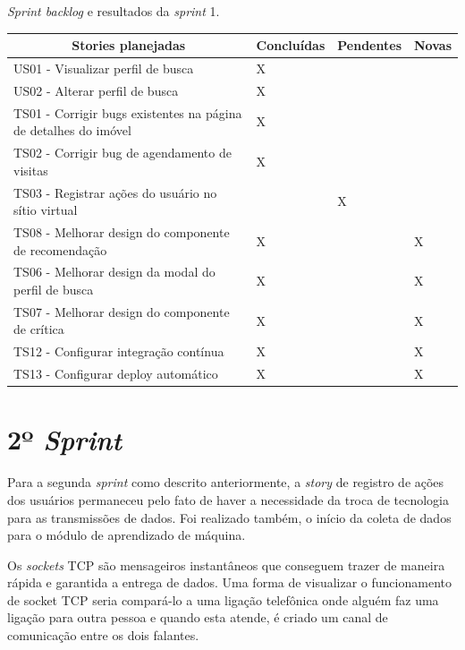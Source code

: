 \begin{quadro}[H]
\centering
\caption[\textit{Sprint backlog} e resultados da \textit{sprint} 1]{\textit{Sprint backlog} e resultados da \textit{sprint} 1.}
\label{quadro:sprint1}
\begin{tabular}{|p{6cm}|p{2cm}|p{2cm}|p{1cm}|}
\hline
\multicolumn{1}{|c|}{\textbf{Stories planejadas}} & \multicolumn{1}{c|}{\textbf{Concluídas}} & \multicolumn{1}{c|}{\textbf{Pendentes}} & \multicolumn{1}{c|}{\textbf{Novas}} \\ \hline
US01 - Visualizar perfil de busca & X &  &  \\ \hline
US02 - Alterar perfil de busca & X &  &  \\ \hline
TS01 - Corrigir bugs existentes na página de detalhes do imóvel & X &  &  \\ \hline
TS02 - Corrigir bug de agendamento de visitas & X &  &  \\ \hline
TS03 - Registrar ações do usuário no sítio virtual &  & X &  \\ \hline
TS08 - Melhorar design do componente de recomendação & X &  & X \\ \hline
TS06 - Melhorar design da modal do perfil de busca & X &  & X \\ \hline
TS07 - Melhorar design do componente de crítica & X &  & X \\ \hline
TS12 - Configurar integração contínua & X &  & X \\ \hline
TS13 - Configurar deploy automático & X &  & X \\ \hline
\end{tabular}
\end{quadro}

\section{2º \textit{Sprint}}
\label{sprint2}

Para a segunda \textit{sprint} como descrito anteriormente, a \textit{story} de registro de ações dos usuários permaneceu pelo fato de haver a necessidade da troca de tecnologia para as transmissões de dados. Foi realizado também, o início da coleta de dados para o módulo de aprendizado de máquina.

Os \textit{sockets} TCP são mensageiros instantâneos que conseguem trazer de maneira rápida e garantida a entrega de dados. Uma forma de visualizar o funcionamento de socket TCP seria compará-lo a uma ligação telefônica onde alguém faz uma ligação para outra pessoa e quando esta atende, é criado um canal de comunicação entre os dois falantes. \cite{Carla:2005}

